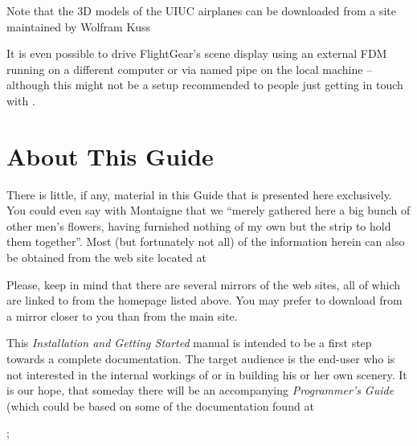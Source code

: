 \noindent
Note that the 3D models of the UIUC airplanes can be downloaded from a site maintained by Wolfram Kuss
\medskip

\medskip

It is even possible to drive FlightGear's scene display using an external
FDM running on a different computer or via named
pipe on the local machine -- although this might not be a
setup recommended to people just getting in touch with \FlightGear.


\section{About This Guide}

There is little, if any, material in this Guide that is presented here exclusively. You
could even say with Montaigne that we ``merely gathered here a big bunch of other men's
flowers, having furnished nothing of my own but the strip to hold them together''. Most
(but fortunately not all) of the information herein can also be obtained from the
\FlightGear{} web site located at
\medskip

\medskip

Please, keep in mind that there are several mirrors of the \FlightGear{} web sites, all
of which are linked to from the \FlightGear{} homepage listed above.
You may prefer to download \FlightGear{} from a mirror closer to you than from the
main site.

This \textit{\FlightGear{} Installation and Getting Started} manual is intended to be a
first step towards a complete \FlightGear{} documentation. The target
audience is the end-user who is not interested in the internal workings of 
or in building his or her own scenery. It is our hope, that someday there
will be an accompanying \textit{\FlightGear{} Programmer's Guide} (which could be based on some of the documentation found at
 \medskip

;
 \medskip

